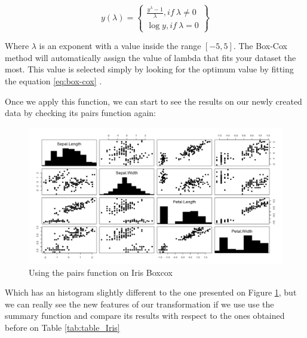 \begin{equation}
\label{eq:box-cox}
 {y(\lambda)=} \left\{
 \begin{aligned}
        \frac{y^{\lambda} - 1}{\lambda} ,  if \  \lambda \neq 0\\
        {\log y}, if \ \lambda = 0
       \end{aligned}
 \right\}
 \end{equation} 
\newline

Where $\lambda$ is an exponent with a value inside the range $[-5,5]$. The Box-Cox method will automatically assign the value of lambda that fits your dataset the most. This value is selected simply by looking for the optimum value by fitting the equation \ref{eq:box-cox} . \par

Once we apply this function, we can start to see the results on our newly created data by checking its pairs function again:

\begin{figure}[H]
	\centering
	\includegraphics[width=17cm]{Figuras_tfg/Figure_Boxcox}
	\caption{Using the pairs function on Iris Boxcox}
	\label{fig:figure_pairs_iris}
\end{figure}

Which has an histogram slightly different to the one presented on Figure \ref{fig:figure_pairs_iris}, but we can really see the new features of our transformation if we use use the summary function and compare its results with respect to the ones obtained before on Table \ref{tab:table_Iris}
\newline

